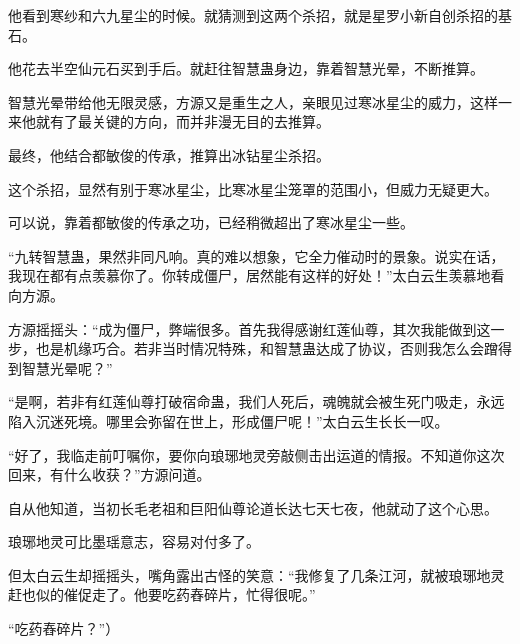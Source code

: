 \begin{this_body}
他看到寒纱和六九星尘的时候。就猜测到这两个杀招，就是星罗小新自创杀招的基石。

他花去半空仙元石买到手后。就赶往智慧蛊身边，靠着智慧光晕，不断推算。

智慧光晕带给他无限灵感，方源又是重生之人，亲眼见过寒冰星尘的威力，这样一来他就有了最关键的方向，而并非漫无目的去推算。

最终，他结合都敏俊的传承，推算出冰钻星尘杀招。

这个杀招，显然有别于寒冰星尘，比寒冰星尘笼罩的范围小，但威力无疑更大。

可以说，靠着都敏俊的传承之功，已经稍微超出了寒冰星尘一些。

“九转智慧蛊，果然非同凡响。真的难以想象，它全力催动时的景象。说实在话，我现在都有点羡慕你了。你转成僵尸，居然能有这样的好处！”太白云生羡慕地看向方源。

方源摇摇头：“成为僵尸，弊端很多。首先我得感谢红莲仙尊，其次我能做到这一步，也是机缘巧合。若非当时情况特殊，和智慧蛊达成了协议，否则我怎么会蹭得到智慧光晕呢？”

“是啊，若非有红莲仙尊打破宿命蛊，我们人死后，魂魄就会被生死门吸走，永远陷入沉迷死境。哪里会弥留在世上，形成僵尸呢！”太白云生长长一叹。

“好了，我临走前叮嘱你，要你向琅琊地灵旁敲侧击出运道的情报。不知道你这次回来，有什么收获？”方源问道。

自从他知道，当初长毛老祖和巨阳仙尊论道长达七天七夜，他就动了这个心思。

琅琊地灵可比墨瑶意志，容易对付多了。

但太白云生却摇摇头，嘴角露出古怪的笑意：“我修复了几条江河，就被琅琊地灵赶也似的催促走了。他要吃药舂碎片，忙得很呢。”

“吃药舂碎片？”）

\end{this_body}

